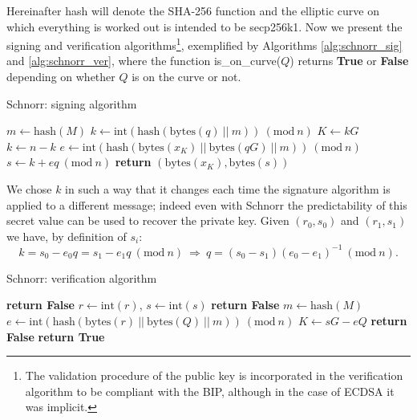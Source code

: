\bigskip
\noindent
Hereinafter hash will denote the SHA-256 function and the elliptic curve on which everything is worked out is intended to be secp256k1. Now we present the signing and verification algorithms\footnote{The validation procedure of the public key is incorporated in the verification algorithm to be compliant with the BIP, although in the case of ECDSA it was implicit.}, exemplified by Algorithms \ref{alg:schnorr_sig} and \ref{alg:schnorr_ver}, where the function is\_on\_curve($Q$) returns \textbf{True} or \textbf{False} depending on whether $Q$ is on the curve or not.

\bigskip

\begin{algorithm}
	\caption{Schnorr: signing algorithm}
	\label{alg:schnorr_sig}
	\begin{algorithmic}[1]
		\State $m \gets \text{hash}(M)$
		\State $k \gets \text{int}(\text{hash}(\text{bytes}(q) \ || \ m)) \ (\text{mod} \ n)$
		\State $K \gets kG$
		\State $k \gets n - k$
		\EndIf
		\State $e \gets \text{int}(\text{hash}(\text{bytes}(x_K) \ || \ \text{bytes}(qG) \ || \ m)) \ (\text{mod} \ n)$
		\State $s \gets k + eq \ (\text{mod} \ n)$
		\State \textbf{return} $(\text{bytes}(x_K), \text{bytes}(s))$
		\EndProcedure
	\end{algorithmic}
\end{algorithm}

\noindent
We chose $k$ in such a way that it changes each time the signature algorithm is applied to a different message; indeed even with Schnorr the predictability of this secret value can be used to recover the private key. Given $(r_0, s_0)$ and $(r_1, s_1)$ we have, by definition of $s_i$:
$$k = s_0 - e_0q = s_1 - e_1q\ (\text{mod} \ n) \ \Longrightarrow \ q = (s_0 - s_1)(e_0 - e_1)^{-1} \ (\text{mod} \ n).$$

\bigskip

\begin{algorithm}
	\caption{Schnorr: verification algorithm}
	\label{alg:schnorr_ver}
	\begin{algorithmic}[1]
		\State \textbf{return False}
		\EndIf 
		\State $r \gets \text{int}(r)$, $s \gets \text{int}(s)$
		\State \textbf{return False}
		\EndIf
		\State $m \gets \text{hash}(M)$
		\State $e \gets \text{int}(\text{hash}(\text{bytes}(r) \ || \ \text{bytes}(Q) \ || \ m)) \ (\text{mod} \ n)$
		\State $K \gets sG - eQ$
		\State \textbf{return False} 
		\EndIf
		\State \textbf{return True}
		\EndProcedure	
	\end{algorithmic}
\end{algorithm}


